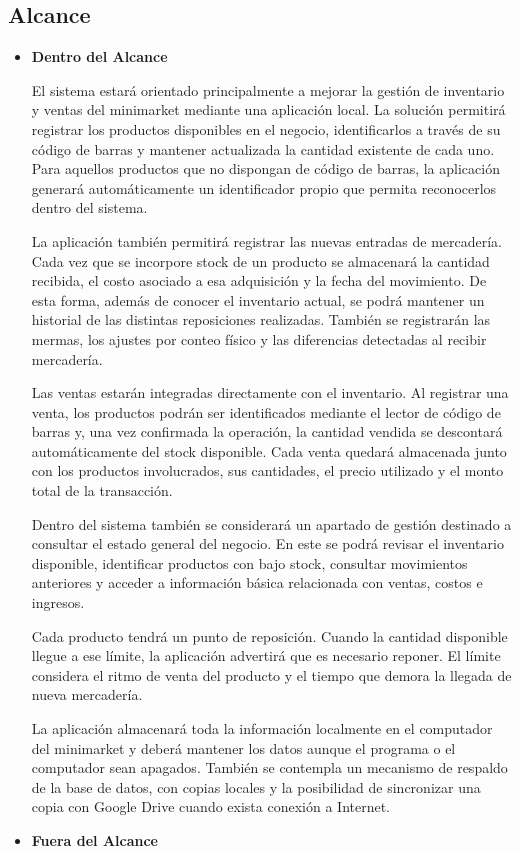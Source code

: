 \documentclass[10pt,a4paper]{article}
\begin{document}
\subsection{Alcance}
\begin{itemize}
\item \textbf{Dentro del Alcance}

El sistema estará orientado principalmente a mejorar la gestión de inventario y ventas del minimarket mediante una aplicación local. La solución permitirá registrar los productos disponibles en el negocio, identificarlos a través de su código de barras y mantener actualizada la cantidad existente de cada uno. Para aquellos productos que no dispongan de código de barras, la aplicación generará automáticamente un identificador propio que permita reconocerlos dentro del sistema.

La aplicación también permitirá registrar las nuevas entradas de mercadería. Cada vez que se incorpore stock de un producto se almacenará la cantidad recibida, el costo asociado a esa adquisición y la fecha del movimiento. De esta forma, además de conocer el inventario actual, se podrá mantener un historial de las distintas reposiciones realizadas. También se registrarán las mermas, los ajustes por conteo físico y las diferencias detectadas al recibir mercadería.

Las ventas estarán integradas directamente con el inventario. Al registrar una venta, los productos podrán ser identificados mediante el lector de código de barras y, una vez confirmada la operación, la cantidad vendida se descontará automáticamente del stock disponible. Cada venta quedará almacenada junto con los productos involucrados, sus cantidades, el precio utilizado y el monto total de la transacción.

Dentro del sistema también se considerará un apartado de gestión destinado a consultar el estado general del negocio. En este se podrá revisar el inventario disponible, identificar productos con bajo stock, consultar movimientos anteriores y acceder a información básica relacionada con ventas, costos e ingresos.

Cada producto tendrá un punto de reposición. Cuando la cantidad disponible llegue a ese límite, la aplicación advertirá que es necesario reponer. El límite considera el ritmo de venta del producto y el tiempo que demora la llegada de nueva mercadería.

La aplicación almacenará toda la información localmente en el computador del minimarket y deberá mantener los datos aunque el programa o el computador sean apagados. También se contempla un mecanismo de respaldo de la base de datos, con copias locales y la posibilidad de sincronizar una copia con Google Drive cuando exista conexión a Internet.
\item \textbf{Fuera del Alcance}


\end{itemize}
\end{document}
